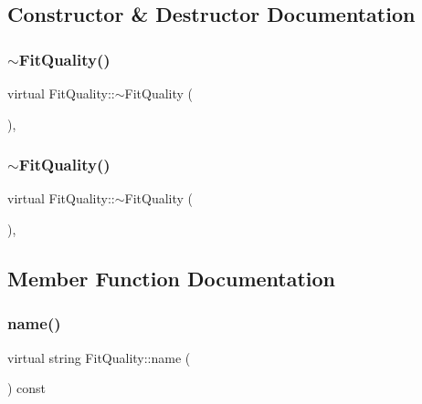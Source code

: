 \subsection{Constructor \& Destructor Documentation}
\mbox{\label{classFitQuality_ae2281a610e7618f03b0c0255adb86de1}} 
\subsubsection{\texorpdfstring{$\sim$FitQuality()}{~FitQuality()}\hspace{0.1cm}{\footnotesize\ttfamily [1/2]}}
{\footnotesize\ttfamily virtual Fit\+Quality\+::$\sim$\+Fit\+Quality (\begin{DoxyParamCaption}{ }\end{DoxyParamCaption})\hspace{0.3cm}{\ttfamily [inline]}, {\ttfamily [virtual]}}

\mbox{\label{classFitQuality_ae2281a610e7618f03b0c0255adb86de1}} 
\subsubsection{\texorpdfstring{$\sim$FitQuality()}{~FitQuality()}\hspace{0.1cm}{\footnotesize\ttfamily [2/2]}}
{\footnotesize\ttfamily virtual Fit\+Quality\+::$\sim$\+Fit\+Quality (\begin{DoxyParamCaption}{ }\end{DoxyParamCaption})\hspace{0.3cm}{\ttfamily [inline]}, {\ttfamily [virtual]}}



\subsection{Member Function Documentation}
\mbox{\label{classFitQuality_a3423e236f25d68cf822094b363a74780}} 
\subsubsection{\texorpdfstring{name()}{name()}\hspace{0.1cm}{\footnotesize\ttfamily [1/2]}}
{\footnotesize\ttfamily virtual string Fit\+Quality\+::name (\begin{DoxyParamCaption}{ }\end{DoxyParamCaption}) const\hspace{0.3cm}{\ttfamily [pure virtual]}}



